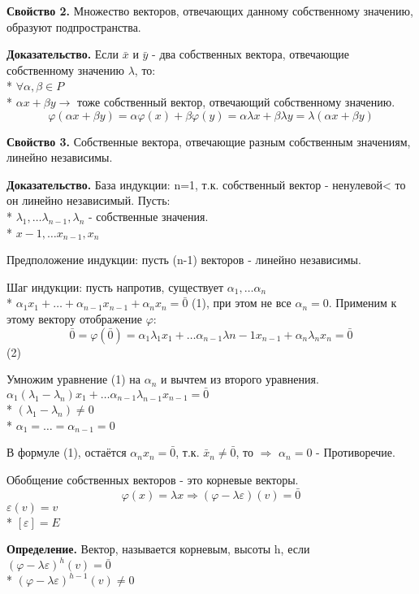 \documentclass{article}
\begin{document}
{\bf Свойство 2.} Множество векторов, отвечающих данному собственному значению, образуют подпространства.

{\bf Доказательство.} Если $\bar{x}$ и $\bar{y}$ - два собственных вектора, отвечающие собственному значению $\lambda$, то:\\*
$\forall \alpha, \beta \in P$\\*
$\alpha x + \beta y \to$ тоже собственный вектор, отвечающий собственному значению.
$$\varphi(\alpha x + \beta y)=\alpha\varphi(x)+\beta\varphi(y)=\alpha\lambda x + \beta\lambda y=\lambda(\alpha x+\beta y)$$

{\bf Свойство 3.} Собственные вектора, отвечающие разным собственным значениям, линейно независимы.

{\bf Доказательство.} База индукции: n=1, т.к. собственный вектор - ненулевой< то он линейно независимый. Пусть:\\*
$\lambda_1,\ldots\lambda_{n-1},\lambda_n$ - собственные значения.\\*
$x-1,\ldots x_{n-1},x_n$

Предположение индукции: пусть (n-1) векторов - линейно независимы.

Шаг индукции: пусть напротив, существует $\alpha_1,\ldots\alpha_n$\\*
$\alpha_1x_1+\ldots+\alpha_{n-1}x_{n-1}+\alpha_nx_n=\bar{0}$ (1), при этом  не все $\alpha_n=0$. Применим к этому вектору отображение $\varphi$:
$$\bar{0}=\varphi(\bar{0})=\alpha_1\lambda_1x_1+\ldots\alpha_{n-1}\lambda{n-1}x_{n-1}+\alpha_n\lambda_nx_n=\bar{0}$$ (2)

Умножим уравнение (1) на $\alpha_n$ и вычтем из второго уравнения.
$\alpha_1(\lambda_1-\lambda_n)x_1+\ldots\alpha_{n-1}\lambda_{n-1}x_{n-1}=\bar{0}$\\*
$(\lambda_1-\lambda_n)\ne0$\\*
$\alpha_1=\ldots=\alpha_{n-1}=0$

В формуле (1), остаётся $\alpha_nx_n=\bar{0}$, т.к. $\bar{x}_n\ne\bar{0}$, то $\Rightarrow$ $\alpha_n=0$ - Противоречие.

Обобщение собственных векторов - это корневые векторы.
$$\varphi(x)=\lambda x\Rightarrow(\varphi-\lambda\varepsilon)(v)=\bar{0}$$
$\varepsilon(v)=v$\\*
$[\varepsilon]=E$

{\bf Определение.} Вектор, называется корневым, высоты h, если $(\varphi-\lambda\varepsilon)^h(v)=\bar{0}$\\*
$(\varphi-\lambda\varepsilon)^{h-1}(v)\ne0$
\end{document}
